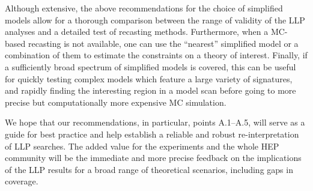 \noindent
Although extensive, the above recommendations for the choice of simplified
models allow for a thorough comparison between the range of validity of
the LLP analyses and a detailed test of recasting methods.
Furthermore, when a MC-based recasting is not available, one
can use the ``nearest'' simplified model or a combination of them to
estimate the constraints on a theory of interest.
Finally, if a sufficiently broad  spectrum of simplified models is covered, this can
be useful for quickly testing complex models which feature a large variety of signatures,
and rapidly finding the interesting region in a model scan before going to more precise but
computationally more expensive MC simulation.

We hope that our recommendations, in particular, points A.1--A.5, will serve as a guide for best practice and help establish a reliable and robust re-interpretation of LLP searches.
The added value for the experiments and the whole HEP community will be the immediate and more precise feedback on the implications of the LLP results for a broad range of theoretical scenarios, including gaps in coverage.


%
%
%
%
